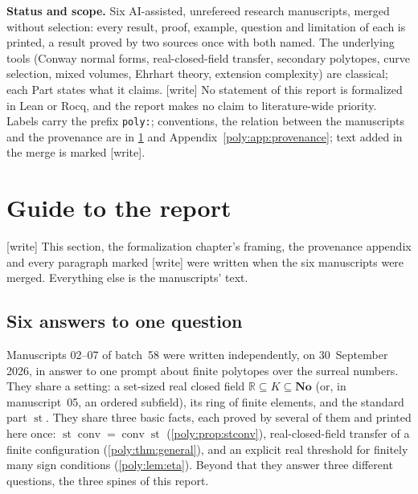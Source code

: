 \documentclass[11pt,a4paper]{article}
\numberwithin{equation}{section}
\theoremstyle{plain}
\newcommand{\wtag}{\textup{[write]}}%
\newcommand{\No}{\mathbf{No}}
\newcommand{\R}{\mathbb R}
\newcommand{\st}{\operatorname{st}}
\newcommand{\conv}{\operatorname{conv}}
\begin{document}
\begin{titlepage}
\begin{abstract}
pure mixed-volume valuation. Part~IV counts lattice points: a quadrilateral
with the vertex shadows of the unit square can have counting function
$(n+1)^2-\lceil\alpha n\rceil$ for any irrational $0<\alpha<1$, whose
generating function has the unit circle as a natural boundary. Part~V
constructs polygons whose coordinates agree to all orders of an
infinitesimal with a polygon of logarithmic extension complexity, while
their own complexity grows like a power of $n$; such gaps exist exactly
when the infinitesimal is not an order unit of the value group.
\end{abstract}
\vfill
\noindent\textbf{Status and scope.} Six AI-assisted, unrefereed research
manuscripts, merged without selection: every result, proof, example,
question and limitation of each is printed, a result proved by two sources
once with both named. The underlying tools (Conway normal forms,
real-closed-field transfer, secondary polytopes, curve selection, mixed
volumes, Ehrhart theory, extension complexity) are classical; each Part
states what it claims. \wtag{} No statement of this report is formalized in
Lean or Rocq, and the report makes no claim to literature-wide priority.
Labels carry the prefix \texttt{poly:}; conventions, the relation between
the manuscripts and the provenance are in \cref{poly:sec:guide} and
Appendix~\ref{poly:app:provenance}; text added in the merge is marked
\wtag{}.
\end{titlepage}
\hypersetup{pageanchor=true}
\setcounter{page}{1}
{\small\setlength{\parskip}{0pt}\tableofcontents}
\clearpage

\section{Guide to the report}\label{poly:sec:guide}

\noindent\wtag{} This section, the formalization chapter's framing, the
provenance appendix and every paragraph marked \wtag{} were written when the
six manuscripts were merged. Everything else is the manuscripts' text.

\subsection{Six answers to one question}

Manuscripts 02--07 of batch~58 were written independently, on
30~September 2026, in answer to one prompt about finite polytopes over the
surreal numbers. They share a setting: a set-sized real closed field
$\R\subseteq K\subseteq\No$ (or, in manuscript~05, an ordered subfield), its
ring of finite elements, and the standard part $\st$. They share three
basic facts, each proved by several of them and printed here once:
$\st\conv=\conv\st$ (\cref{poly:prop:stconv}), real-closed-field transfer
of a finite configuration (\cref{poly:thm:general}), and an explicit real
threshold for finitely many sign conditions (\cref{poly:lem:eta}). Beyond
that they answer three different questions, the three spines of this report.
\end{document}
